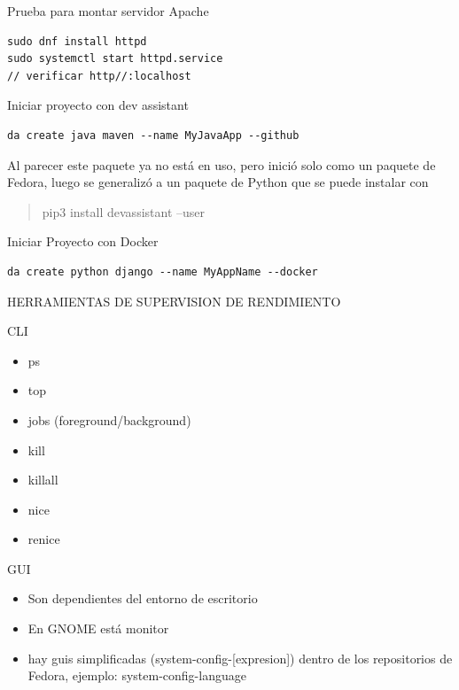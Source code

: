 \documentclass[presentation]{beamer}
\begin{document}
\begin{frame}[fragile,label=sec-15]{Prueba para montar servidor Apache}
 \begin{verbatim}
sudo dnf install httpd
sudo systemctl start httpd.service
// verificar http//:localhost
\end{verbatim}
\end{frame}
\begin{frame}[fragile,label=sec-16]{Iniciar proyecto con dev assistant}
 \begin{verbatim}
da create java maven --name MyJavaApp --github
\end{verbatim}

Al parecer este paquete ya no está en uso, pero inició solo como un paquete de Fedora, luego 
se generalizó a un paquete de Python que se puede instalar con
\begin{quote}
pip3 install devassistant --user
\end{quote}
\end{frame}

\begin{frame}[fragile,label=sec-17]{Iniciar Proyecto con Docker}
 \begin{verbatim}
da create python django --name MyAppName --docker
\end{verbatim}
\end{frame}

\begin{frame}[label=sec-18]{HERRAMIENTAS DE SUPERVISION DE RENDIMIENTO}
\begin{block}{CLI}
\begin{itemize}
\item ps
\item top
\item jobs (foreground/background)
\item kill
\item killall
\item nice
\item renice
\end{itemize}
\end{block}

\begin{block}{GUI}
\begin{itemize}
\item Son dependientes del entorno de escritorio
\item En GNOME está monitor
\item hay guis simplificadas (system-config-[expresion]) dentro de los repositorios de Fedora, ejemplo: system-config-language
\end{itemize}
\end{block}
\end{frame}
\end{document}
